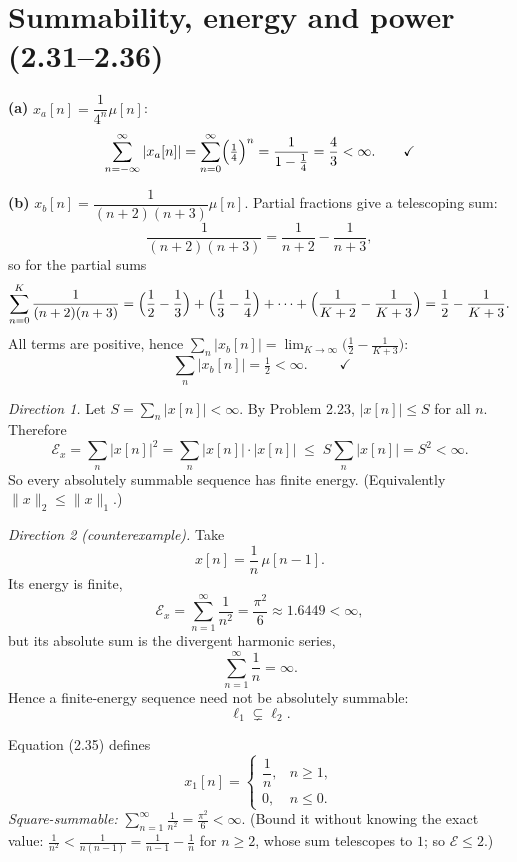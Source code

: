 \section{Summability, energy and power (2.31--2.36)}


\textbf{(a)} $x_a[n]=\dfrac{1}{4^{n}}\mu[n]$:
\[
\sum_{n=-\infty}^{\infty}|x_a[n]|=\sum_{n=0}^{\infty}\Bigl(\tfrac14\Bigr)^{n}
=\frac{1}{1-\tfrac14}=\frac43<\infty . \qquad\checkmark
\]

\textbf{(b)} $x_b[n]=\dfrac{1}{(n+2)(n+3)}\mu[n]$. Partial fractions give a telescoping sum:
\[
\frac{1}{(n+2)(n+3)}=\frac{1}{n+2}-\frac{1}{n+3},
\]
so for the partial sums
\[
\sum_{n=0}^{K}\frac{1}{(n+2)(n+3)}
=\Bigl(\frac12-\frac13\Bigr)+\Bigl(\frac13-\frac14\Bigr)+\cdots+\Bigl(\frac{1}{K+2}-\frac{1}{K+3}\Bigr)
=\frac12-\frac{1}{K+3}.
\]
All terms are positive, hence $\sum_n |x_b[n]|=\lim_{K\to\infty}\bigl(\tfrac12-\tfrac{1}{K+3}\bigr)$:
\[
\boxed{\;\sum_{n}|x_b[n]|=\tfrac12<\infty .\;}\qquad\checkmark
\]


\emph{Direction 1.} Let $S=\sum_n|x[n]|<\infty$. By Problem 2.23, $|x[n]|\le S$ for all $n$.
Therefore
\[
\mathcal{E}_x=\sum_{n}|x[n]|^{2}=\sum_{n}|x[n]|\cdot|x[n]|
\;\le\;S\sum_{n}|x[n]|=S^{2}<\infty .
\]
So every absolutely summable sequence has finite energy. (Equivalently
$\|x\|_2\le\|x\|_1$.)

\emph{Direction 2 (counterexample).} Take
\[
x[n]=\frac{1}{n}\,\mu[n-1].
\]
Its energy is finite,
\[
\mathcal{E}_x=\sum_{n=1}^{\infty}\frac{1}{n^{2}}=\frac{\pi^{2}}{6}\approx 1.6449<\infty,
\]
but its absolute sum is the divergent harmonic series,
\[
\sum_{n=1}^{\infty}\frac{1}{n}=\infty .
\]
Hence a finite-energy sequence need not be absolutely summable:
\[
\boxed{\;\ell_1\subsetneq\ell_2 .\;}
\]


Equation (2.35) defines
\[
x_1[n]=\begin{cases}\dfrac1n, & n\ge 1,\\[4pt] 0, & n\le 0 .\end{cases}
\]
\emph{Square-summable:} $\displaystyle\sum_{n=1}^{\infty}\frac{1}{n^{2}}=\frac{\pi^{2}}{6}<\infty$.
(Bound it without knowing the exact value: $\frac{1}{n^2}<\frac{1}{n(n-1)}=\frac{1}{n-1}-\frac1n$
for $n\ge2$, whose sum telescopes to $1$; so $\mathcal{E}\le 2$.)

